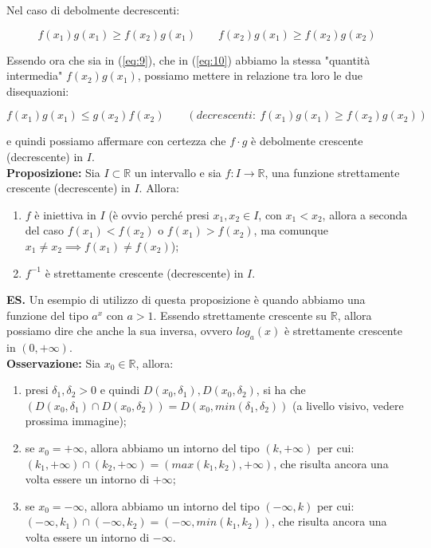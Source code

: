 \documentclass{article}
\begin{document}
\noindent Nel caso di debolmente decrescenti: 

\begin{equation*}
    f(x_1)g(x_1) \geq f(x_2)g(x_1) \qquad f(x_2)g(x_1) \geq f(x_2)g(x_2)
\end{equation*}

\noindent Essendo ora che sia in (\ref{eq:9}), che in (\ref{eq:10}) abbiamo la stessa "quantità intermedia" $f(x_2)g(x_1)$, possiamo mettere in relazione tra loro le due disequazioni:

\begin{equation*}
    f(x_1)g(x_1) \leq g(x_2)f(x_2) \qquad (decrescenti: \ f(x_1)g(x_1) \geq f(x_2)g(x_2))
\end{equation*}

\noindent e quindi possiamo affermare con certezza che $f \cdot g$ è debolmente crescente (decrescente) in $I$.\\

\noindent\textbf{Proposizione:} Sia $I \subset \mathbb{R}$ un intervallo e sia $f: I \xrightarrow{} \mathbb{R}$, una funzione strettamente crescente (decrescente) in $I$. Allora:

\begin{enumerate}
    \item $f$ è iniettiva in $I$ (è ovvio perché presi $x_1, x_2 \in I$, con $x_1 < x_2$, allora a seconda del caso $f(x_1) < f(x_2)$ o $f(x_1) > f(x_2)$, ma comunque $x_1 \neq x_2 \implies f(x_1) \neq f(x_2)$);
    \item $f^{-1}$ è strettamente crescente (decrescente) in $I$.
\end{enumerate}

\noindent\textbf{ES.} Un esempio di utilizzo di questa proposizione è quando abbiamo una funzione del tipo $a^x$ con $a > 1$. Essendo strettamente crescente su $\mathbb{R}$, allora possiamo dire che anche la sua inversa, ovvero $log_a(x)$ è strettamente crescente in $(0, +\infty)$.\\

\noindent\textbf{Osservazione:} Sia $x_0 \in \mathbb{R}$, allora:

\begin{enumerate}[label=\alph{enumi})]
    \item presi $\delta_1, \delta_2 > 0$ e quindi $D(x_0, \delta_1), D(x_0, \delta_2)$, si ha che $(D(x_0, \delta_1) \cap D(x_0, \delta_2)) = D(x_0, min(\delta_1, \delta_2))$ (a livello visivo, vedere prossima immagine);
    \item se $x_0 = + \infty$, allora abbiamo un intorno del tipo $(k, + \infty)$ per cui: $(k_1, +\infty) \cap (k_2, +\infty) = (max(k_1, k_2), +\infty)$, che risulta ancora una volta essere un intorno di $+\infty$;
    \item se $x_0 = - \infty$, allora abbiamo un intorno del tipo $(-\infty, k)$ per cui: $(-\infty, k_1) \cap (-\infty, k_2) = (-\infty, min(k_1, k_2))$, che risulta ancora una volta essere un intorno di $- \infty$. 
\end{enumerate}
\end{document}
